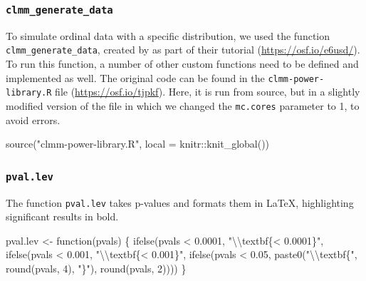 \documentclass[
  bookmarksnumbered]{article}
\newenvironment{Shaded}{\begin{snugshade}}{\end{snugshade}}
\newcommand{\AttributeTok}[1]{\textcolor[rgb]{0.80,0.80,0.80}{#1}}
\newcommand{\ControlFlowTok}[1]{\textcolor[rgb]{0.94,0.87,0.69}{#1}}
\newcommand{\DecValTok}[1]{\textcolor[rgb]{0.86,0.86,0.80}{#1}}
\newcommand{\FloatTok}[1]{\textcolor[rgb]{0.75,0.75,0.82}{#1}}
\newcommand{\FunctionTok}[1]{\textcolor[rgb]{0.94,0.94,0.56}{#1}}
\newcommand{\NormalTok}[1]{\textcolor[rgb]{0.80,0.80,0.80}{#1}}
\newcommand{\OtherTok}[1]{\textcolor[rgb]{0.94,0.94,0.56}{#1}}
\newcommand{\SpecialCharTok}[1]{\textcolor[rgb]{0.86,0.64,0.64}{#1}}
\newcommand{\StringTok}[1]{\textcolor[rgb]{0.80,0.58,0.58}{#1}}
\begin{document}
\hypertarget{clmm_generate_data}{%
\subsubsection{\texorpdfstring{\texttt{clmm\_generate\_data}}{clmm\_generate\_data}}\label{clmm_generate_data}}

To simulate ordinal data with a specific distribution, we used the function \texttt{clmm\_generate\_data}, created by \textcite{bordersPowerAnalysisOrdinal2022} as part of their tutorial (\url{https://osf.io/e6usd/}). To run this function, a number of other custom functions need to be defined and implemented as well. The original code can be found in the \texttt{clmm-power-library.R} file (\url{https://osf.io/tjpkf}). Here, it is run from source, but in a slightly modified version of the file in which we changed the \texttt{mc.cores} parameter to 1, to avoid errors.

\begin{Shaded}
\begin{Highlighting}[]
\FunctionTok{source}\NormalTok{(}\StringTok{"clmm{-}power{-}library.R"}\NormalTok{, }\AttributeTok{local =}\NormalTok{ knitr}\SpecialCharTok{::}\FunctionTok{knit\_global}\NormalTok{())}
\end{Highlighting}
\end{Shaded}

\hypertarget{pval.lev}{%
\subsubsection{\texorpdfstring{\texttt{pval.lev}}{pval.lev}}\label{pval.lev}}

The function \texttt{pval.lev} takes p-values and formats them in \LaTeX, highlighting significant results in bold.

\begin{Shaded}
\begin{Highlighting}[]
\NormalTok{pval.lev }\OtherTok{\textless{}{-}} \ControlFlowTok{function}\NormalTok{(pvals) \{}
  \FunctionTok{ifelse}\NormalTok{(pvals }\SpecialCharTok{\textless{}} \FloatTok{0.0001}\NormalTok{,}
         \StringTok{"}\SpecialCharTok{\textbackslash{}\textbackslash{}}\StringTok{textbf\{\textless{} 0.0001\}"}\NormalTok{,}
         \FunctionTok{ifelse}\NormalTok{(pvals }\SpecialCharTok{\textless{}} \FloatTok{0.001}\NormalTok{,}
                \StringTok{"}\SpecialCharTok{\textbackslash{}\textbackslash{}}\StringTok{textbf\{\textless{} 0.001\}"}\NormalTok{,}
                \FunctionTok{ifelse}\NormalTok{(pvals }\SpecialCharTok{\textless{}} \FloatTok{0.05}\NormalTok{,}
                       \FunctionTok{paste0}\NormalTok{(}\StringTok{"}\SpecialCharTok{\textbackslash{}\textbackslash{}}\StringTok{textbf\{"}\NormalTok{, }\FunctionTok{round}\NormalTok{(pvals, }\DecValTok{4}\NormalTok{), }\StringTok{"\}"}\NormalTok{),}
                       \FunctionTok{round}\NormalTok{(pvals, }\DecValTok{2}\NormalTok{))))}
\NormalTok{\}}
\end{Highlighting}
\end{Shaded}
\end{document}
